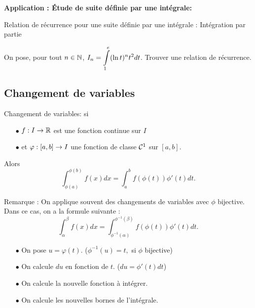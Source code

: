 \documentclass[a4paper, 11pt]{article}
\begin{document}
{{{{\textbf{Application : \'Etude de suite d\'efinie par une int\'egrale:}\\

\begin{dboxminipage}{14cm}
	Relation de r\'ecurrence pour une suite d\'efinie par une int\'egrale : Int\'egration par partie

\end{dboxminipage}


{\footnotesize \begin{exo}
	On pose, pour tout $n\in\mathbb{N}$, $I_n=\displaystyle\int\limits_1^e (\ln{t})^n t^2 dt$. Trouver une relation de r\'ecurrence.
\end{exo}}

\vsec
\vsec\vsec
\subsection{Changement de variables}



\begin{prop} Changement de variables: si
	\begin{itemize}
		\item[$\bullet$] $f : I \rightarrow \mathbb{R}$ est une fonction continue sur $I$
		\item[$\bullet$]  et  $\varphi : [a,b] \rightarrow I$ une fonction de classe $\mathcal{C}^1$ sur $[a,b]$.
	\end{itemize}
	Alors
	$$\int_{\phi(a)}^{\phi(b)} f(x) dx = \int_a^b f(\phi(t)) \phi'(t)dt.$$

\end{prop}

Remarque : On applique souvent des changements de variables avec $\phi$ bijective. Dans ce cas, on a la formule suivante :
$$\int_{\alpha}^{\beta} f(x) dx = \int_{\phi^{-1}(\alpha)}^{\phi^{-1}(\beta)} f(\phi(t)) \phi'(t)dt.$$


\begin{dboxminipage}{12cm}
	\begin{itemize}
		\item[$\bullet$] On pose $u=\varphi(t)$. ($\phi^{-1} (u ) = t,$ si $\phi$ bijective)
		\item[$\bullet$] On calcule $du$ en fonction de $t$. ($du = \phi'(t)dt$)
		\item[$\bullet$] On calcule la nouvelle fonction \`a int\'egrer.
		\item[$\bullet$] On calcule les nouvelles bornes de l'int\'egrale.
	\end{itemize}


\end{dboxminipage}}}}}
\end{document}

